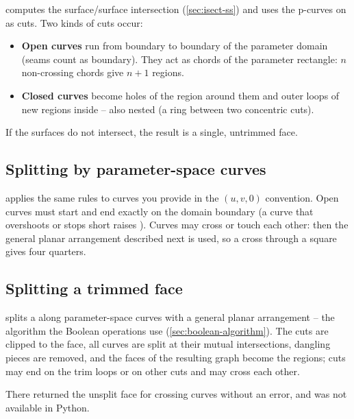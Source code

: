  computes the surface/surface intersection
(\cref{sec:isect-ss}) and uses the p-curves on  as cuts. Two kinds of cuts
occur:

\begin{itemize}
\item \textbf{Open curves} run from boundary to boundary of the parameter domain (seams count
as boundary). They act as chords of the parameter rectangle: $n$ non-crossing chords give
$n+1$ regions.
\item \textbf{Closed curves} become holes of the region around them and outer loops of new
regions inside -- also nested (a ring between two concentric cuts).
\end{itemize}

If the surfaces do not intersect, the result is a single, untrimmed face.

\subsection{Splitting by parameter-space curves}

 applies the same rules to curves you provide in the
$(u,v,0)$ convention. Open curves must start and end exactly on the domain boundary
(a curve that overshoots or stops short raises
).
Curves may cross or touch each other: then the general planar arrangement described next is
used, so a cross through a square gives four quarters.

\subsection{Splitting a trimmed face}

 splits a  along parameter-space curves with a
general planar arrangement -- the algorithm the Boolean operations use
(\cref{sec:boolean-algorithm}). The cuts are clipped to the face, all curves are split at
their mutual intersections, dangling pieces are removed, and the faces of the resulting graph
become the regions; cuts may end on the trim loops or on other cuts and may cross each other.

\begin{note}
There  returned the unsplit face for crossing curves without an
error, and  was not available in Python.
\end{note}

